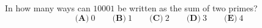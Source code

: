 In how many ways can $10001$ be written as the sum of two primes?
\[\textbf{(A)}\ 0\qquad\textbf{(B)}\ 1\qquad\textbf{(C)}\ 2\qquad\textbf{(D)}\ 3\qquad\textbf{(E)}\ 4\]
